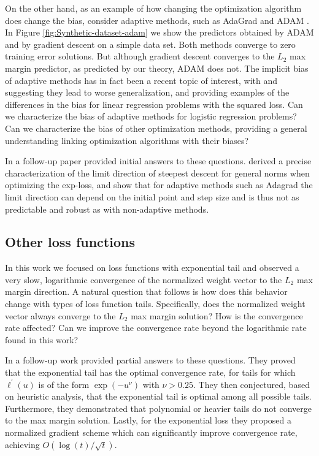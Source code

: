 \documentclass[twoside,11pt,english]{article}
\begin{document}
On the other hand, as an example of how changing the optimization algorithm does change the bias, consider adaptive methods, such as AdaGrad \citep{duchi2011adaptive}
and ADAM \citep{Kingma2015}.
In Figure \ref{fig:Synthetic-dataset-adam} we show the predictors
obtained by ADAM and by gradient descent on a simple data set. Both
methods converge to zero training error solutions. But although gradient
descent converges to the $L_{2}$ max margin predictor, as predicted
by our theory, ADAM does not. The implicit bias of adaptive methods
has in fact been a recent topic of interest, with \citet{Hoffer2017a} and
\citet{Wilson2017} suggesting they lead to worse generalization, and \cite{Wilson2017} providing examples of the differences in the bias for linear regression problems with the squared loss.  Can we characterize the bias of adaptive methods for logistic regression problems?  Can we characterize the bias of other optimization methods, providing a general understanding linking optimization algorithms with their biases?

In a follow-up paper \citep{gunasekar2018characterizing}
provided initial answers to these questions. \citet{gunasekar2018characterizing} derived a precise characterization of the limit direction of steepest descent for general norms when optimizing the exp-loss, and show that for adaptive methods such as Adagrad the limit direction can depend on the initial point and step size and is thus not as predictable and robust as with non-adaptive methods.


\subsection{Other loss functions}
In this work we focused on loss functions with exponential tail and observed a very slow, logarithmic convergence of the normalized weight vector to the $L_2$ max margin direction. A natural question that follows is how does this behavior change with types of loss function tails. Specifically, does the normalized weight vector always converge to the $L_2$ max margin solution? How is the convergence rate affected? Can we improve the convergence rate beyond the logarithmic rate found in this work?

In a follow-up work \cite{Nacson2018} provided partial answers to these questions. They proved that the exponential tail has the optimal convergence rate, for tails for which $\ell^{\prime}(u)$ is of the form $\exp(-u^{\nu})$ with $\nu>0.25$. They then conjectured, based on heuristic analysis, that the exponential tail is optimal among all possible tails. Furthermore, they demonstrated that polynomial or heavier tails do not converge to the max margin solution. Lastly, for the exponential loss they proposed a normalized gradient scheme which can significantly improve convergence rate, achieving $O(\log(t)/\sqrt{t})$.
\end{document}
